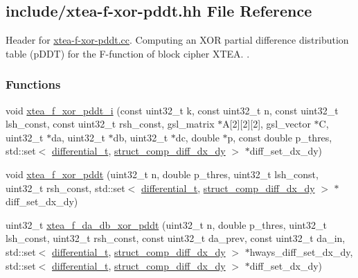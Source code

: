 \hypertarget{xtea-f-xor-pddt_8hh}{\subsection{include/xtea-\/f-\/xor-\/pddt.hh \-File \-Reference}
\label{xtea-f-xor-pddt_8hh}
}


\-Header for \hyperlink{xtea-f-xor-pddt_8cc}{xtea-\/f-\/xor-\/pddt.\-cc}. \-Computing an \-X\-O\-R partial difference distribution table (p\-D\-D\-T) for the \-F-\/function of block cipher \-X\-T\-E\-A. .  


\subsubsection*{\-Functions}
\begin{DoxyCompactItemize}
\item 
void \hyperlink{xtea-f-xor-pddt_8hh_a9646abec85abfa040d9f4e854f408408}{xtea\-\_\-f\-\_\-xor\-\_\-pddt\-\_\-i} (const uint32\-\_\-t k, const uint32\-\_\-t n, const uint32\-\_\-t lsh\-\_\-const, const uint32\-\_\-t rsh\-\_\-const, gsl\-\_\-matrix $\ast$\-A\mbox{[}2\mbox{]}\mbox{[}2\mbox{]}\mbox{[}2\mbox{]}, gsl\-\_\-vector $\ast$\-C, uint32\-\_\-t $\ast$da, uint32\-\_\-t $\ast$db, uint32\-\_\-t $\ast$dc, double $\ast$p, const double p\-\_\-thres, std\-::set$<$ \hyperlink{structdifferential__t}{differential\-\_\-t}, \hyperlink{structstruct__comp__diff__dx__dy}{struct\-\_\-comp\-\_\-diff\-\_\-dx\-\_\-dy} $>$ $\ast$diff\-\_\-set\-\_\-dx\-\_\-dy)
\item 
void \hyperlink{xtea-f-xor-pddt_8hh_a7b7008eb382fd5465162899639968376}{xtea\-\_\-f\-\_\-xor\-\_\-pddt} (uint32\-\_\-t n, double p\-\_\-thres, uint32\-\_\-t lsh\-\_\-const, uint32\-\_\-t rsh\-\_\-const, std\-::set$<$ \hyperlink{structdifferential__t}{differential\-\_\-t}, \hyperlink{structstruct__comp__diff__dx__dy}{struct\-\_\-comp\-\_\-diff\-\_\-dx\-\_\-dy} $>$ $\ast$diff\-\_\-set\-\_\-dx\-\_\-dy)
\item 
uint32\-\_\-t \hyperlink{xtea-f-xor-pddt_8hh_a515d006e47b6956f75dd6814ed403324}{xtea\-\_\-f\-\_\-da\-\_\-db\-\_\-xor\-\_\-pddt} (uint32\-\_\-t n, double p\-\_\-thres, uint32\-\_\-t lsh\-\_\-const, uint32\-\_\-t rsh\-\_\-const, const uint32\-\_\-t da\-\_\-prev, const uint32\-\_\-t da\-\_\-in, std\-::set$<$ \hyperlink{structdifferential__t}{differential\-\_\-t}, \hyperlink{structstruct__comp__diff__dx__dy}{struct\-\_\-comp\-\_\-diff\-\_\-dx\-\_\-dy} $>$ $\ast$hways\-\_\-diff\-\_\-set\-\_\-dx\-\_\-dy, std\-::set$<$ \hyperlink{structdifferential__t}{differential\-\_\-t}, \hyperlink{structstruct__comp__diff__dx__dy}{struct\-\_\-comp\-\_\-diff\-\_\-dx\-\_\-dy} $>$ $\ast$diff\-\_\-set\-\_\-dx\-\_\-dy)

\end{DoxyCompactItemize}

